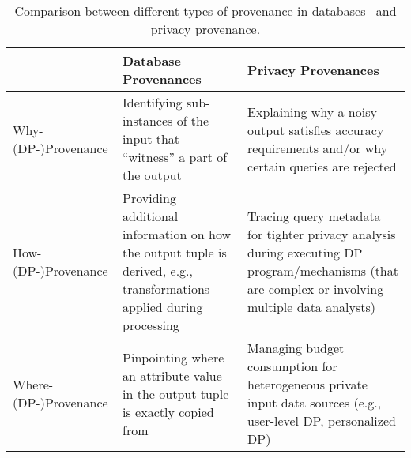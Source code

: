 \begin{table}
    \centering
    \caption{Comparison between different types of provenance in databases~\cite{cheney2009provenance} and privacy provenance.}
    \begin{tabular}{p{3.9cm}|p{5cm}|p{6cm}}
    \toprule\hline
         & \textbf{Database Provenances~\cite{cheney2009provenance}} & \textbf{Privacy Provenances} \\ \hline
      Why-(DP-)Provenance   & {Identifying sub-instances of the input that ``witness'' a part of the output}  & Explaining why a noisy output satisfies accuracy requirements and/or why certain queries are rejected  \\ \hline
      How-(DP-)Provenance   & Providing additional information on how the output tuple is derived, e.g., transformations applied during processing & Tracing query metadata for tighter privacy analysis during executing DP program/mechanisms (that are complex or involving multiple data analysts) \\ \hline
      Where-(DP-)Provenance   & Pinpointing where an attribute value in the output tuple is exactly copied from & Managing budget consumption for heterogeneous private input data sources (e.g., user-level DP, personalized DP) \\ \hline \bottomrule
    \end{tabular}
    \label{tab:comp_prov_dp}
\end{table}



